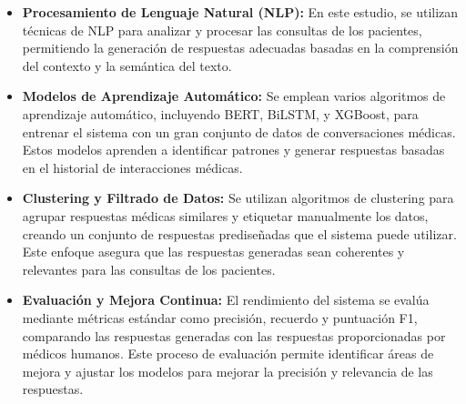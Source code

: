 		\begin{itemize}
			\item \textbf{Procesamiento de Lenguaje Natural (NLP):} En este estudio, se utilizan técnicas de NLP para analizar y procesar las consultas de los pacientes, permitiendo la generación de respuestas adecuadas basadas en la comprensión del contexto y la semántica del texto.
				
			\item \textbf{	Modelos de Aprendizaje Automático: }Se emplean varios algoritmos de aprendizaje automático, incluyendo BERT, BiLSTM, y XGBoost, para entrenar el sistema con un gran conjunto de datos de conversaciones médicas. Estos modelos aprenden a identificar patrones y generar respuestas basadas en el historial de interacciones médicas.
				
			\item \textbf{	Clustering y Filtrado de Datos:} Se utilizan algoritmos de clustering para agrupar respuestas médicas similares y etiquetar manualmente los datos, creando un conjunto de respuestas prediseñadas que el sistema puede utilizar. Este enfoque asegura que las respuestas generadas sean coherentes y relevantes para las consultas de los pacientes.
				
			\item \textbf{	Evaluación y Mejora Continua:} El rendimiento del sistema se evalúa mediante métricas estándar como precisión, recuerdo y puntuación F1, comparando las respuestas generadas con las respuestas proporcionadas por médicos humanos. Este proceso de evaluación permite identificar áreas de mejora y ajustar los modelos para mejorar la precisión y relevancia de las respuestas.
				
		\end{itemize}

